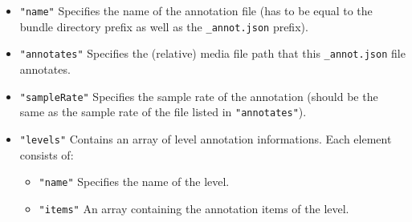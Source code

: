 \documentclass[]{book}
\begin{document}
\begin{itemize}
\item
  \texttt{"name"} Specifies the name of the annotation file (has to be equal
  to the bundle directory prefix as well as the \texttt{\_annot.json} prefix).
\item
  \texttt{"annotates"} Specifies the (relative) media file path that this
  \texttt{\_annot.json} file annotates.
\item
  \texttt{"sampleRate"} Specifies the sample rate of the annotation (should
  be the same as the sample rate of the file listed in \texttt{"annotates"}).
\item
  \texttt{"levels"} Contains an array of level annotation informations. Each
  element consists of:

  \begin{itemize}
  \item
    \texttt{"name"} Specifies the name of the level.
  \item
    \texttt{"items"} An array containing the annotation items of the level.


\end{itemize}
\end{itemize}
\end{document}
